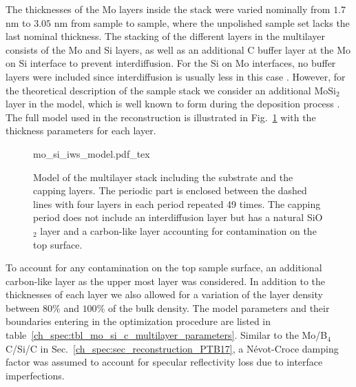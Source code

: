 The thicknesses of the Mo layers inside the stack were varied nominally from $1.7$ nm to $3.05$ nm from sample to sample, where the unpolished sample set lacks the last nominal thickness. The stacking of the different layers in the multilayer consists of the Mo and Si layers, as well as an additional C buffer layer at the Mo on Si interface to prevent interdiffusion. For the Si on Mo interfaces, no buffer layers were included since interdiffusion is usually less in this case \cite{petford-long_highresolution_1987}. However, for the theoretical description of the sample stack we consider an additional MoSi$_2$ layer in the model, which is well known to form during the deposition process \cite{bajt_investigation_2001}. The full model used in the reconstruction is illustrated in Fig.~\ref{ch_spec:fig_model_unpolished_and_polished_samples} with the thickness parameters for each layer.
\begin{figure}[htbp]
    \def\svgwidth{0.7\textwidth}
    \selectfont\footnotesize
    {mo_si_iws_model.pdf_tex}
    \caption{Model of the multilayer stack including the substrate and the capping layers. The periodic part is enclosed between the dashed lines with four layers in each period repeated 49 times. The capping period does not include an interdiffusion layer but has a natural SiO$_2$ layer and a carbon-like layer accounting for contamination on the top surface.}
    \label{ch_spec:fig_model_unpolished_and_polished_samples}
\end{figure}
To account for any contamination on the top sample surface, an additional carbon-like layer as the upper most layer was considered. In addition to the thicknesses of each layer we also allowed for a variation of the layer density between $80\%$ and $100\%$ of the bulk density. The model parameters and their boundaries entering in the optimization procedure are listed in table~\ref{ch_spec:tbl_mo_si_c_multilayer_parameters}. Similar to the Mo/B$_4$C/Si/C in Sec.~\ref{ch_spec:sec_reconstruction_PTB17}, a N\'{e}vot-Croce damping factor was assumed to account for specular reflectivity loss due to interface imperfections. 
